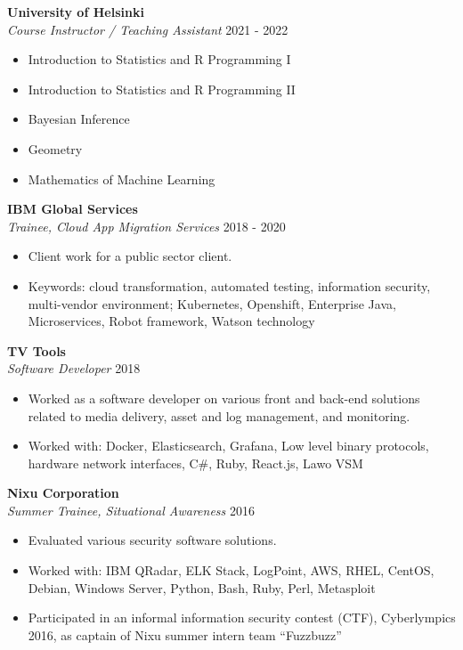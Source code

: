 \documentclass[margin, 10pt]{res} %
\begin{document}
\begin{resume}
\textbf{University of Helsinki}\\
{\sl Course Instructor / Teaching Assistant} \hfill 2021 - 2022  \\
\begin{itemize}
	\item Introduction to Statistics and R Programming I
	\item Introduction to Statistics and R Programming II
	\item Bayesian Inference
	\item Geometry
	\item Mathematics of Machine Learning
\end{itemize}
  
\textbf{IBM Global Services}\\
{\sl Trainee, Cloud App Migration Services} \hfill 2018 - 2020
\begin{itemize} \itemsep -2pt %
\item Client work for a public sector client.
\item Keywords: cloud transformation, automated testing, information security, multi-vendor environment; Kubernetes, Openshift, Enterprise Java, Microservices, Robot framework, Watson technology
\end{itemize}

\addvspace{-7pt}
\textbf{TV Tools}\\
{\sl Software Developer} \hfill 2018
\begin{itemize} \itemsep -2pt %
\item Worked as a software developer on various front and back-end solutions related to media delivery, asset and log management, and monitoring.
\item Worked with: Docker, Elasticsearch, Grafana, Low level binary protocols, hardware network interfaces, C\#, Ruby, React.js, Lawo VSM
\end{itemize}

\addvspace{-7pt}
\textbf{Nixu Corporation}\\
{\sl Summer Trainee, Situational Awareness} \hfill 2016
\begin{itemize} \itemsep -2pt %
\item Evaluated various security software solutions.
\item Worked with:  IBM QRadar, ELK Stack, LogPoint, AWS, RHEL, CentOS, Debian, Windows Server, Python, Bash, Ruby, Perl, Metasploit
\item Participated in an informal information security contest (CTF), Cyberlympics 2016, as captain of Nixu summer intern team ``Fuzzbuzz''  
\end{itemize}


\end{resume}
\end{document}
